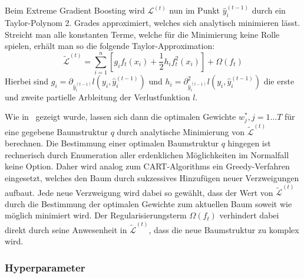 Beim Extreme Gradient Boosting wird $\mathcal{L}^{(t)}$ nun im Punkt $\hat{y}^{(t-1)}_i$ durch ein Taylor-Polynom 2. Grades
approximiert, welches sich analytisch minimieren l\"asst.
Streicht man alle konstanten Terme, welche f\"ur die Minimierung keine Rolle spielen, erh\"alt man so die folgende Taylor-Approximation:
\begin{equation}
    \tilde{\mathcal{L}}^{(t)} = \sum_{i=1}^{n} \left[ g_i f_t(x_i) + \frac{1}{2}h_i f_t^2(x_i) \right] + \Omega(f_t)
\end{equation}
Hierbei sind $g_i = \partial_{\hat{y}_i^{(t-1)}} l(y_i, \hat{y}_i^{(t-1)})$ und 
$h_i = \partial_{\hat{y}_i^{(t-1)}}^2 l(y_i, \hat{y}_i^{(t-1)})$ die erste und zweite partielle Arbleitung der Verlustfunktion
$l$.

Wie in~\cite{XGBoost} gezeigt wurde, lassen sich dann die optimalen Gewichte $w_j^*, j=1 \ldots T$ f\"ur eine gegebene Baumstruktur
$q$ durch analytische Minimierung von $\tilde{\mathcal{L}}^{(t)}$ berechnen.
Die Bestimmung einer optimalen Baumstruktur $q$ hingegen ist rechnerisch durch Enumeration aller erdenklichen M\"oglichkeiten im
Normalfall keine Option.
Daher wird analog zum CART-Algorithms ein Greedy-Verfahren eingesetzt, welches den Baum durch sukzessives Hinzuf\"ugen neuer
Verzweigungen aufbaut.
Jede neue Verzweigung wird dabei so gew\"ahlt, dass der Wert von $\tilde{\mathcal{L}}^{(t)}$ durch die Bestimmung der optimalen
Gewichte zum aktuellen Baum soweit wie m\"oglich minimiert wird.
Der Regularisierungsterm $\Omega(f_t)$ verhindert dabei direkt durch seine Anwesenheit in $\tilde{\mathcal{L}}^{(t)}$, dass die neue
Baumstruktur zu komplex wird.

\subsubsection{Hyperparameter}

